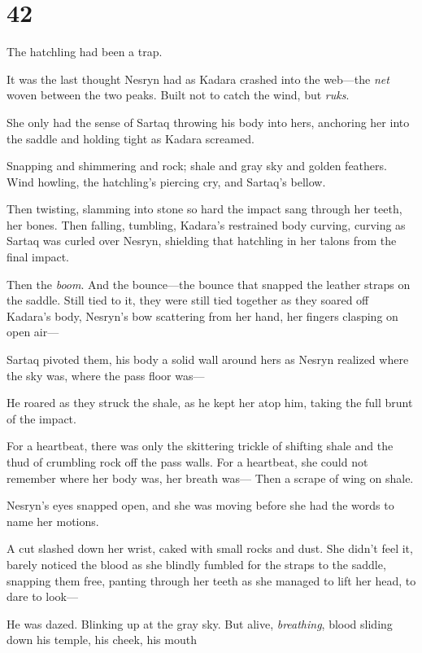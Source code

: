 
\chapter{42}

The hatchling had been a trap.

It was the last thought Nesryn had as Kadara crashed into the web---the
\emph{net} woven between the two peaks. Built not to catch the wind, but
\emph{ruks}.

She only had the sense of Sartaq throwing his body into hers, anchoring her into the saddle and holding tight as Kadara screamed.

Snapping and shimmering and rock; shale and gray sky and golden feathers. Wind howling, the hatchling's piercing cry, and Sartaq's bellow.

Then twisting, slamming into stone so hard the impact sang through her teeth, her bones. Then falling, tumbling, Kadara's restrained body curving, curving as Sartaq was curled over Nesryn, shielding that hatchling in her talons from the final impact.

Then the \emph{boom}. And the bounce---the bounce that snapped the leather straps on the saddle. Still tied to it, they were still tied together as they soared off Kadara's body, Nesryn's bow scattering from her hand, her fingers clasping on open air---

Sartaq pivoted them, his body a solid wall around hers as Nesryn realized where the sky was, where the pass floor was---

He roared as they struck the shale, as he kept her atop him, taking the full brunt of the impact.

For a heartbeat, there was only the skittering trickle of shifting shale and the thud of crumbling rock off the pass walls. For a heartbeat, she could not remember where her body was, her breath was--- Then a scrape of wing on shale.

Nesryn's eyes snapped open, and she was moving before she had the words to name her motions.

A cut slashed down her wrist, caked with small rocks and dust. She didn't feel it, barely noticed the blood as she blindly fumbled for the straps to the saddle, snapping them free, panting through her teeth as she managed to lift her head, to dare to look---

He was dazed. Blinking up at the gray sky. But alive, \emph{breathing}, blood sliding down his temple, his cheek, his mouth 

